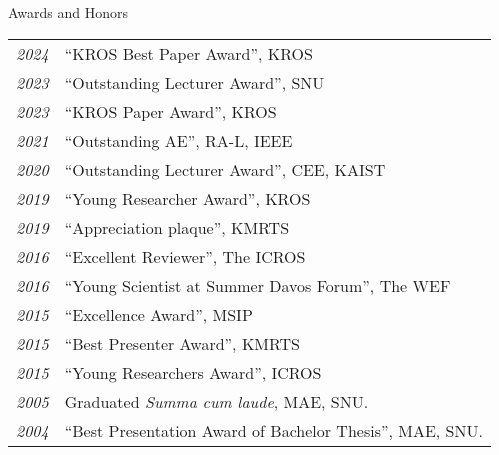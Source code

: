 \begin{rSection}{Awards and Honors}
    \begin{tabular}{ @{} >{\itshape}l @{\hspace{6ex}} l }
    2024        & ``KROS Best Paper Award'', \ac{KROS}\\
    2023        & ``Outstanding Lecturer Award'', SNU\\
    2023        & ``KROS Paper Award'', \ac{KROS}\\
    2021        & ``Outstanding AE'', RA-L, IEEE\\
    2020        & ``Outstanding Lecturer Award'', CEE, KAIST\\
    2019        & ``Young Researcher Award'', \ac{KROS}\\
    2019        & ``Appreciation plaque'', \ac{KMRTS}\\
    2016        & ``Excellent Reviewer'', The \ac{ICROS} \\
    2016        & ``Young Scientist at Summer Davos Forum'', The \ac{WEF} \\
    2015        & ``Excellence Award'', \ac{MSIP} \\
    2015        & ``Best Presenter Award'', \ac{KMRTS}\\
    2015        & ``Young Researchers Award'', \ac{ICROS} \\
    2005        & Graduated {\em Summa cum laude}, MAE, SNU. \\
    2004        & ``Best Presentation Award of Bachelor Thesis'', MAE, SNU. \\
    \end{tabular}
\end{rSection}
